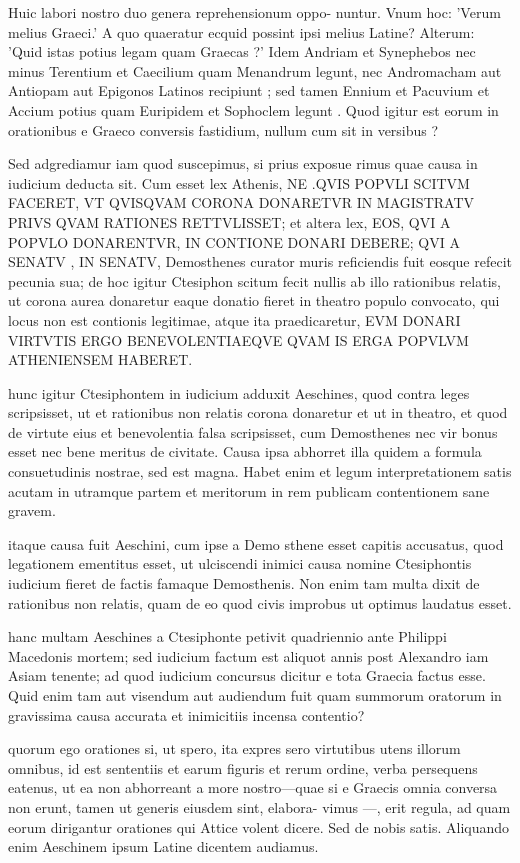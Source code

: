  Huic labori nostro duo genera reprehensionum oppo- nuntur. Vnum hoc: 'Verum melius Graeci.' A quo quaeratur ecquid possint ipsi melius Latine? Alterum: 'Quid istas potius legam quam Graecas ?' Idem Andriam et Synephebos nec minus Terentium et Caecilium quam Menandrum legunt, nec Andromacham aut Antiopam aut Epigonos Latinos recipiunt ; sed tamen Ennium et Pacuvium et Accium potius quam Euripidem et Sophoclem legunt . Quod igitur est eorum in orationibus e Graeco conversis fastidium, nullum cum sit in versibus ?

 Sed adgrediamur iam quod suscepimus, si prius exposue rimus quae causa in iudicium deducta sit. Cum esset lex Athenis, NE .QVIS POPVLI SCITVM FACERET, VT QVISQVAM CORONA DONARETVR IN MAGISTRATV PRIVS QVAM RATIONES RETTVLISSET; et altera lex, EOS, QVI A POPVLO DONARENTVR, IN CONTIONE DONARI DEBERE; QVI A SENATV , IN SENATV, Demosthenes curator muris reficiendis fuit eosque refecit pecunia sua; de hoc igitur Ctesiphon scitum fecit nullis ab illo rationibus relatis, ut corona aurea donaretur eaque donatio fieret in theatro populo convocato, qui locus non est contionis legitimae, atque ita praedicaretur, EVM DONARI VIRTVTIS ERGO BENEVOLENTIAEQVE QVAM IS ERGA POPVLVM ATHENIENSEM HABERET.

 hunc igitur Ctesiphontem in iudicium adduxit Aeschines, quod contra leges scripsisset, ut et rationibus non relatis corona donaretur et ut in theatro, et quod de virtute eius et benevolentia falsa scripsisset, cum Demosthenes nec vir bonus esset nec bene meritus de civitate. Causa ipsa abhorret illa quidem a formula consuetudinis nostrae, sed est magna. Habet enim et legum interpretationem satis acutam in utramque partem et meritorum in rem publicam contentionem sane gravem.

 itaque causa fuit Aeschini, cum ipse a Demo sthene esset capitis accusatus, quod legationem ementitus esset, ut ulciscendi inimici causa nomine Ctesiphontis iudicium fieret de factis famaque Demosthenis. Non enim tam multa dixit de rationibus non relatis, quam de eo quod civis improbus ut optimus laudatus esset.

 hanc multam Aeschines a Ctesiphonte petivit quadriennio ante Philippi Macedonis mortem; sed iudicium factum est aliquot annis post Alexandro iam Asiam tenente; ad quod iudicium concursus dicitur e tota Graecia factus esse. Quid enim tam aut visendum aut audiendum fuit quam summorum oratorum in gravissima causa accurata et inimicitiis incensa contentio?

 quorum ego orationes si, ut spero, ita expres sero virtutibus utens illorum omnibus, id est sententiis et earum figuris et rerum ordine, verba persequens eatenus, ut ea non abhorreant a more nostro—quae si e Graecis omnia conversa non erunt, tamen ut generis eiusdem sint, elabora- vimus —, erit regula, ad quam eorum dirigantur orationes qui Attice volent dicere. Sed de nobis satis. Aliquando enim Aeschinem ipsum Latine dicentem audiamus.
